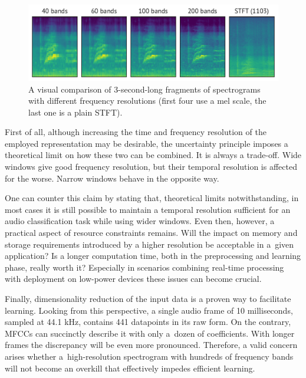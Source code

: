 \documentclass{article}
\begin{document}
\begin{sloppy}
\begin{figure}[b]
  \vspace{-12pt}
  \centering
  \centerline{\includegraphics[width=\columnwidth]{figures/spectrograms.pdf}}
  \vspace{-6pt}
  \caption{A visual comparison of 3-second-long fragments of spectrograms with different frequency resolutions (first four use a mel scale, the last one is a plain STFT).}
  \label{fig:spectrograms}
  \vspace{-2pt}
\end{figure}

First of all, although increasing the time and frequency resolution of the employed representation may be desirable, the uncertainty principle imposes a theoretical limit on how these two can be combined. It is always a trade-off. Wide windows give good frequency resolution, but their temporal resolution is affected for the worse. Narrow windows behave in the opposite way.

One can counter this claim by stating that, theoretical limits notwithstanding, in most cases it is still possible to maintain a temporal resolution sufficient for an audio classification task while using wider windows. Even then, however, a practical aspect of resource constraints remains. Will the impact on memory and storage requirements introduced by a higher resolution be acceptable in a~given application? Is a longer computation time, both in the preprocessing and learning phase, really worth it? Especially in scenarios combining real-time processing with deployment on low-power devices these issues can become crucial.

Finally, dimensionality reduction of the input data is a proven way to facilitate learning. Looking from this perspective, a single audio frame of 10 milliseconds, sampled at 44.1 kHz, contains 441 datapoints in its raw form. On the contrary, MFCCs can succinctly describe it with only a~dozen of coefficients. With longer frames the discrepancy will be even more pronounced. Therefore, a valid concern arises whether a~high-resolution spectrogram with hundreds of frequency bands will not become an overkill that effectively impedes efficient learning.


\end{sloppy}
\end{document}
